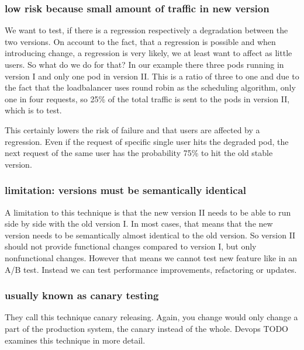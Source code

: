 \subsubsection{low risk because small amount of traffic in new version}
We want to test, if there is a regression respectively a degradation between the two
versions. On account to the fact, that a regression is possible and when introducing
change, a regression is very likely, we at least want to affect as little users. So what
do we do for that? In our example there three pods running in version I and only one pod
in version II. This is a ratio of three to one and due to the fact that the loadbalancer
uses round robin as the scheduling algorithm, only one in four requests, so 25\% of the
total traffic is sent to the pods in version II, which is to test.

This certainly lowers the risk of failure and that users are affected by a
regression. Even if the request of specific single user hits the degraded pod, the next
request of the same user has the probability 75\% to hit the old stable version.

\subsubsection{limitation: versions must be semantically identical}
A limitation to this technique is that the new version II needs to be able to run side by
side with the old version I. In most cases, that means that the new version needs to be
semantically almost identical to the old version. So version II should not provide
functional changes compared to version I, but only nonfunctional changes. However that
means we cannot test new feature like in an A/B test. Instead we can test performance
improvements, refactoring or updates.

\subsubsection{usually known as canary testing}
They call this technique canary releasing. Again, you change would only change a part of
the production system, the canary instead of the whole. Devops TODO examines this
technique in more detail.

